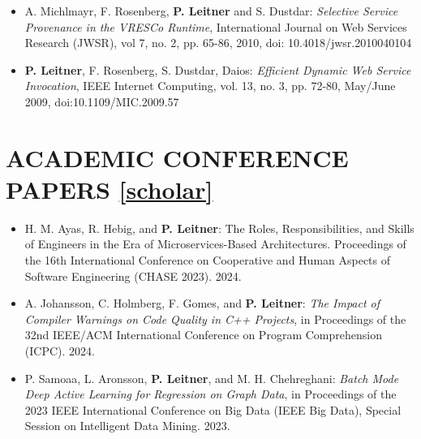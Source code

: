 \documentclass[paper=letter,fontsize=11pt]{scrartcl} %
\newcommand{\NewPart}[2]{\section*{\uppercase{#1} #2}}
\begin{document}
\begin{itemize}
\item A. Michlmayr, F. Rosenberg, \textbf{P. Leitner} and S. Dustdar: \emph{Selective Service Provenance in the VRESCo Runtime}, International Journal on Web Services Research (JWSR), vol 7, no. 2, pp. 65-86, 2010, doi: 10.4018/jwsr.2010040104
\item \textbf{P. Leitner}, F. Rosenberg, S. Dustdar, Daios: \emph{Efficient Dynamic Web Service Invocation}, IEEE Internet Computing, vol. 13, no. 3, pp. 72-80, May/June 2009, doi:10.1109/MIC.2009.57
\end{itemize}

\NewPart{Academic Conference Papers}{\href{https://scholar.google.ch/citations?user=wZ9f8CAAAAAJ}{[scholar]}}

\begin{itemize}
  \item  H. M. Ayas, R. Hebig, and \textbf{P. Leitner}: The Roles, Responsibilities, and Skills of Engineers in the Era of
  Microservices-Based Architectures. Proceedings of the 16th International Conference on Cooperative and Human Aspects of Software Engineering (CHASE 2023). 2024.
  \item  A. Johansson, C. Holmberg, F. Gomes, and \textbf{P. Leitner}: \emph{The Impact of Compiler Warnings on Code Quality in C++ Projects}, in Proceedings of the 32nd IEEE/ACM International Conference on Program Comprehension (ICPC). 2024.
  \item P. Samoaa, L. Aronsson,  \textbf{P. Leitner}, and M. H. Chehreghani: \emph{Batch Mode Deep Active Learning for Regression on Graph Data}, in Proceedings of the 2023 IEEE International Conference on Big Data (IEEE Big Data), Special Session on Intelligent Data Mining. 2023.

\end{itemize}
\end{document}

